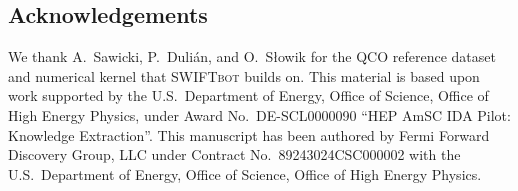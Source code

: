 \documentclass[twocolumn,superscriptaddress,showpacs,nofootinbib,notitlepage,preprintnumbers,secnumarabic,amssymb, nobibnotes, aps, prd]{revtex4-2}
\newcommand{\SWIFTbot}{\textsc{SWIFTbot}\xspace}
\begin{document}
\subsection*{Acknowledgements}

We thank A.~Sawicki, P.~Duli{\'a}n, and O.~S{\l}owik for the QCO reference dataset and numerical kernel that \SWIFTbot builds on. This material is based upon work supported by the U.S.\ Department of Energy, Office of Science, Office of High Energy Physics, under Award No.\ DE-SCL0000090 ``HEP AmSC IDA Pilot: Knowledge Extraction''. This manuscript has been authored by Fermi Forward Discovery Group, LLC under Contract No.\ 89243024CSC000002 with the U.S.\ Department of Energy, Office of Science, Office of High Energy Physics.


\end{document}
